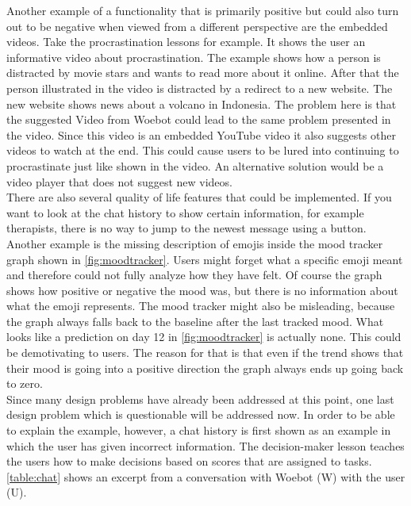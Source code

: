 Another example of a functionality that is primarily positive but could also turn out to be negative when viewed from a different perspective are the embedded videos.
Take the procrastination lessons for example.
It shows the user an informative video about procrastination\cite{procrastination-video}.
The example shows how a person is distracted by movie stars and wants to read more about it online.
After that the person illustrated in the video is distracted by a redirect to a new website.
The new website shows news about a volcano in Indonesia.
The problem here is that the suggested Video from Woebot could lead to the same problem presented in the video.
Since this video is an embedded YouTube video it also suggests other videos to watch at the end.
This could cause users to be lured into continuing to procrastinate just like shown in the video.
An alternative solution would be a video player that does not suggest new videos.\\

There are also several quality of life features that could be implemented.
If you want to look at the chat history to show certain information, for example therapists, there is no way to jump to the newest message using a button.
Another example is the missing description of emojis inside the mood tracker graph shown in \autoref{fig:moodtracker}.
Users might forget what a specific emoji meant and therefore could not fully analyze how they have felt.
Of course the graph shows how positive or negative the mood was, but there is no information about what the emoji represents.
The mood tracker might also be misleading, because the graph always falls back to the baseline after the last tracked mood.
What looks like a prediction on day 12 in \autoref{fig:moodtracker} is actually none.
This could be demotivating to users.
The reason for that is that even if the trend shows that their mood is going into a positive direction the graph always ends up going back to zero.\\

Since many design problems have already been addressed at this point, one last design problem which is questionable will be addressed now.
In order to be able to explain the example, however, a chat history is first shown as an example in which the user has given incorrect information.
The decision-maker lesson teaches the users how to make decisions based on scores that are assigned to tasks.
\autoref{table:chat} shows an excerpt from a conversation with Woebot (W) with the user (U).

